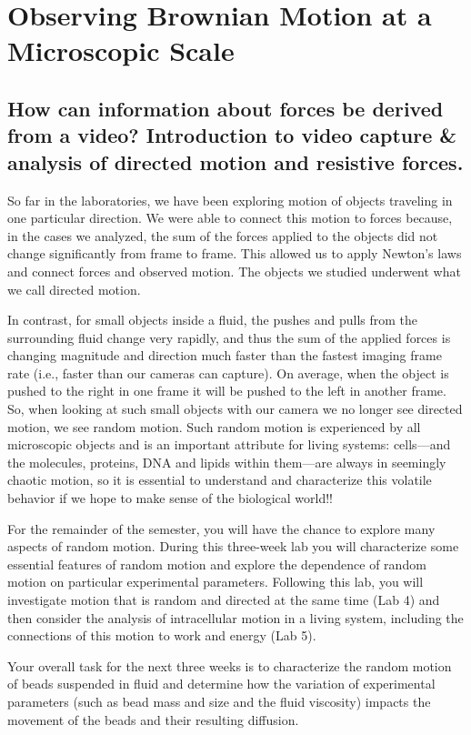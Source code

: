 \chapter{Observing Brownian Motion at a Microscopic Scale}
\thispagestyle{fancy}
%
\section{How can information about forces be derived from a video? Introduction to video capture \& analysis of directed motion and resistive forces.}
So far in the laboratories, we have been exploring motion of objects traveling in one particular direction.
We were able to connect this motion to forces because, in the cases we analyzed, the sum of the forces applied to the objects did not change significantly from frame to frame.
This allowed us to apply Newton’s laws and connect forces and observed motion.
The objects we studied underwent what we call directed motion.
\par
In contrast, for small objects inside a fluid, the pushes and pulls from the surrounding fluid change very rapidly, and thus the sum of the applied forces is changing magnitude and direction much faster than the fastest imaging frame rate (i.e., faster than our cameras can capture).
On average, when the object is pushed to the right in one frame it will be pushed to the left in another frame.
So, when looking at such small objects with our camera we no longer see directed motion, we see random motion.
Such random motion is experienced by all microscopic objects and is an important attribute for living systems: cells—and the molecules, proteins, DNA and lipids within them—are always in seemingly chaotic motion, so it is essential to understand and characterize this volatile behavior if we hope to make sense of the biological world!!
\par
For the remainder of the semester, you will have the chance to explore many aspects of random motion.
During this three-week lab you will characterize some essential features of random motion and explore the dependence of random motion on particular experimental parameters.
Following this lab, you will investigate motion that is random and directed at the same time (Lab 4) and then consider the analysis of intracellular motion in a living system, including the connections of this motion to work and energy (Lab 5).
\par 
Your overall task for the next three weeks is to characterize the random motion of beads suspended in fluid and determine how the variation of experimental parameters (such as bead mass and size and the fluid viscosity) impacts the movement of the beads and their resulting diffusion.
